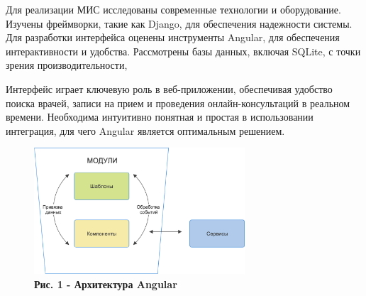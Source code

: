 \begin{multicols}{2}
Для реализации МИС исследованы современные технологии и оборудование.
Изучены фреймворки, такие как Django, для обеспечения надежности
системы. Для разработки интерфейса оценены инструменты Angular, для
обеспечения интерактивности и удобства. Рассмотрены базы данных, включая
SQLite, с точки зрения производительности,

Интерфейс играет ключевую роль в веб-приложении, обеспечивая удобство
поиска врачей, записи на прием и проведения онлайн-консультаций в
реальном времени. Необходима интуитивно понятная и простая в
использовании интеграция, для чего Angular является оптимальным
решением.
\end{multicols}

\begin{figure}[H]
	\centering
	\includegraphics[width=0.7\textwidth]{assets/151}
	\caption*{\bfseries Рис. 1 - Архитектура Angular}
\end{figure}


